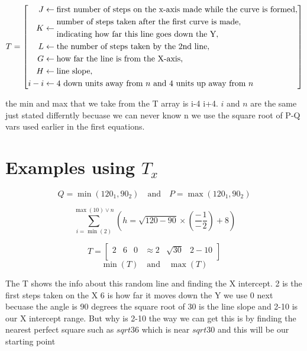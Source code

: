 \documentclass{article}
\begin{document}
\[
T = \left[ \begin{array}{@{}l@{}}
    \begin{aligned}
        J &\leftarrow \text{first number of steps on the x-axis made while the curve is formed}, \\
        K &\leftarrow \begin{aligned}&\text{number of steps taken after the first curve is made,} \\ &\text{indicating how far this line goes down the Y},\end{aligned} \\
        L &\leftarrow \text{the number of steps taken by the 2nd line}, \\
        G &\leftarrow \text{how far the line is from the X-axis}, \\
        H &\leftarrow \text{line slope}, \\
        i-i &\leftarrow 4 \text{ down units away from } n \text{ and 4 units up away from } n
    \end{aligned}
\end{array} \right]
\]

the min and max that we take from the T array is i-4 i+4. \(i\) and \(n\) are the same just stated differntly becuase we can never know n we use the square root of P-Q vars used earlier in the first equations.

 \section{Examples using \(T_x\)}

\[
Q = \min(120_1, 90_2) \quad \text{and} \quad P = \max(120_1, 90_2)
\]

\[
\sum_{i=\min(2)}^{\max(10) \vee n} \left( h = \sqrt{120 - 90} \times \left( \frac{-}{-} \frac{1}{2} \right) + 8 \right)
\]

\[
T = \begin{bmatrix}
    2 & 6 & 0 & \approx 2 & \sqrt{30} & 2-10 \\
\end{bmatrix}
\]
\[
\min(T) \quad \text{and} \quad \max(T)
\]

The T shows the info about this random line and finding the X intercept. 2 is the first steps taken on the X 6 is how far it moves down the Y we use 0 next becuase the angle is 90 degrees the square root of 30 is the line slope and 2-10 is our X intercept range. But why is  2-10 the way we can get this is by finding the nearest perfect square such as \(sqrt{36}\) which is near \(sqrt{30}\) and this will be our starting point 
\end{document}
